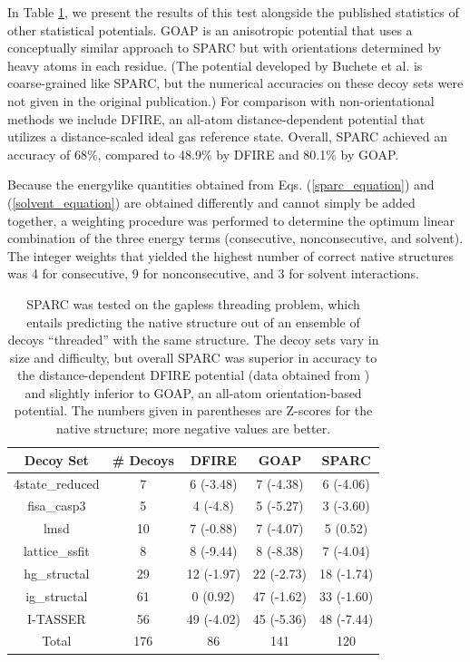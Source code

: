 \documentclass[11pt,titlepage]{article}
\begin{document}
In Table \ref{decoy_table}, we present the results of this test alongside the published statistics of other statistical potentials.
GOAP \cite{zhou2} is an anisotropic potential that uses a conceptually similar approach to SPARC but with orientations determined by heavy atoms in each residue.
(The potential developed by Buchete et al. \cite{buchete2003,buchete3} is coarse-grained like SPARC, but the numerical accuracies on these decoy sets were not given in the original publication.)
For comparison with non-orientational methods we include DFIRE, an all-atom distance-dependent potential that utilizes a distance-scaled ideal gas reference state.
Overall, SPARC achieved an accuracy of 68\%, compared to 48.9\% by DFIRE and 80.1\% by GOAP.

Because the energylike quantities obtained from Eqs. (\ref{sparc_equation}) and (\ref{solvent_equation}) are obtained differently and cannot simply be added together, a weighting procedure was performed to determine the optimum linear combination of the three energy terms (consecutive, nonconsecutive, and solvent).
The integer weights that yielded the highest number of correct native structures was 4 for consecutive, 9 for nonconsecutive, and 3 for solvent interactions.

\begin{table}
	\begin{center}
	\begin{tabular}{c c c c c}
		\toprule
		Decoy Set & \# Decoys & DFIRE & GOAP & SPARC \\
		\midrule
		4state\_reduced & 7 & 6 (-3.48) & 7 (-4.38) & 6 (-4.06)  \\
		fisa\_casp3 & 5 & 4 (-4.8)  & 5 (-5.27)  & 3 (-3.60)  \\
		lmsd & 10 & 7 (-0.88) & 7 (-4.07) & 5 (0.52)   \\
		lattice\_ssfit & 8 & 8 (-9.44) & 8 (-8.38) & 7 (-4.04)  \\
		hg\_structal & 29 & 12 (-1.97) & 22 (-2.73) & 18 (-1.74) \\
		ig\_structal & 61 & 0 (0.92)   & 47 (-1.62) & 33 (-1.60) \\
		I-TASSER & 56 & 49 (-4.02) & 45 (-5.36) & 48 (-7.44) \\
		\midrule
		Total & 176 & 86 & 141 & 120 \\
		\bottomrule
	\end{tabular}
	\end{center}
	\caption{SPARC was tested on the gapless threading problem, which entails predicting the native structure out of an ensemble of decoys ``threaded'' with the same structure. The decoy sets vary in size and difficulty, but overall SPARC was superior in accuracy to the distance-dependent DFIRE potential (data obtained from \cite{zhou2}) and slightly inferior to GOAP, an all-atom orientation-based potential. The numbers given in parentheses are Z-scores for the native structure; more negative values are better.}
	\label{decoy_table}
\end{table}
\end{document}

